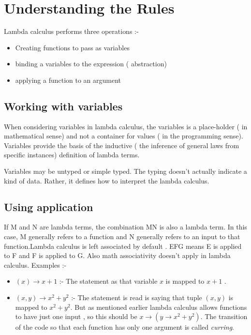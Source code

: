 \section{Understanding the Rules}
Lambda calculus performs three operations :-
\begin{itemize}
\item Creating functions to pass as variables 
\item binding a variables to the expression ( abstraction)
\item applying a function to an argument
\end{itemize}
\subsection{Working with variables}
When considering variables in lambda calculus, the variables is a place-holder ( in mathematical sense) and not a container for values ( in the programming sense). Variables provide the basis of the inductive ( the inference of general laws from specific instances) definition of lambda terms. 

Variables may be untyped or simple typed. The typing doesn't actually indicate a kind of data. Rather, it defines how to interpret the lambda calculus.
\subsection{Using application}
If M and N are lambda terms, the combination MN is also a lambda term. In this case, M generally refers to a function and N generally refers to an input to that function.Lambda calculus is left associated by default . EFG means E is applied to F and F is applied to G. Also math associativity doesn't apply in lambda calculus. Examples :-
\begin{itemize}
\item  $(x)  \rightarrow  x + 1 $ :- The statement as that variable $x$ is mapped to $ x + 1$ .
\item $(x,y) \rightarrow x^2 + y^2 $ :- The statement is read is saying that tuple $(x,y) $ is mapped to $x^2 + y^2$. But as mentioned earlier lambda calculus allows functions to have just one input , so this should be  $x \rightarrow (y \rightarrow x^2 + y^2 )$. The transition of the code so that each function has only one argument  is called \emph{curring}.
\end{itemize}
